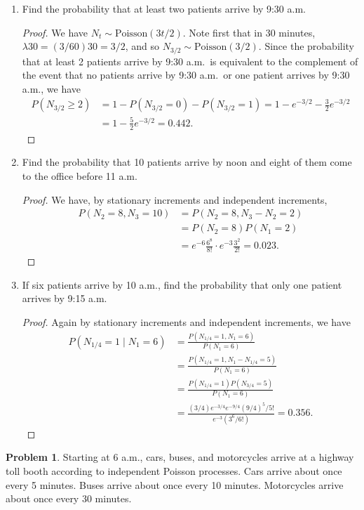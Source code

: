 \documentclass[oneside]{amsart}
\newcommand{\Pois}{\mathrm{Poisson}}
\theoremstyle{definition}
\newtheorem{prob}{Problem}
\begin{document}
\begin{enumerate}[label=(\roman*)]
\item
Find the probability that at least two patients arrive by 9:30 a.m.
\begin{proof}
We have $N_t \sim \Pois(3t/2)$. Note first that in 30 minutes, $\lambda 30 = (3/60)30 = 3/2$, and so $N_{3/2} \sim \Pois(3/2)$. Since the probability that at least 2 patients arrive by 9:30 a.m.\ is equivalent to the complement of the event that no patients arrive by 9:30 a.m.\ or one patient arrives by 9:30 a.m., we have
\begin{align*}
	P(N_{3/2} \geq 2) &= 1 - P(N_{3/2} = 0) - P(N_{3/2} = 1) 
	= 1 - e^{-3/2} - \frac{3}{2} e^{-3/2}  \\
				    &= 1 - \frac{5}{2} e^{-3/2} = 0.442.
\end{align*}
\end{proof}

\item
Find the probability that 10 patients arrive by noon and eight of them come to the office before 11 a.m.
\begin{proof}
We have, by stationary increments and independent increments, 
\begin{align*}
	P(N_2 = 8, N_3 = 10) &= P(N_2 = 8, N_3 - N_2 = 2) \\
					  &= P(N_2 = 8) P(N_1= 2)  \\
					  &=e^{-6}\frac{6^8}{8!} \cdot e^{-3} \frac{3^2}{2!} 
					  = 0.023.
\end{align*}
\end{proof}
\item
If six patients arrive by 10 a.m., find the probability that only one patient arrives by 9:15 a.m.
\begin{proof}
Again by stationary increments and independent increments, we have
\begin{align*}
	P(N_{1/4} = 1 \mid N_1 = 6) &= \frac{P(N_{1/4} = 1, N_1 = 6)}{P(N_1 = 6)} \\
	&= \frac{P(N_{1/4} = 1, N_1- N_{1/4} = 5)}{P(N_1 = 6)} \\ 
	&= \frac{P(N_{1/4} = 1)P(N_{3/4} = 5)}{P(N_1 = 6)}  \\
	&= \frac{(3/4)e^{-3/4}e^{-9/4} (9/4)^5/ 5!}{e^{-3} (3^6/6!)} 
	= 0.356.
\end{align*}
\end{proof}

\end{enumerate}


\begin{prob}
Starting at 6 a.m., cars, buses, and motorcycles arrive at a highway toll booth according to independent Poisson processes. Cars arrive about once every 5 minutes. Buses arrive about once every 10 minutes. Motorcycles arrive about once every 30 minutes.
\end{prob}
\end{document}
